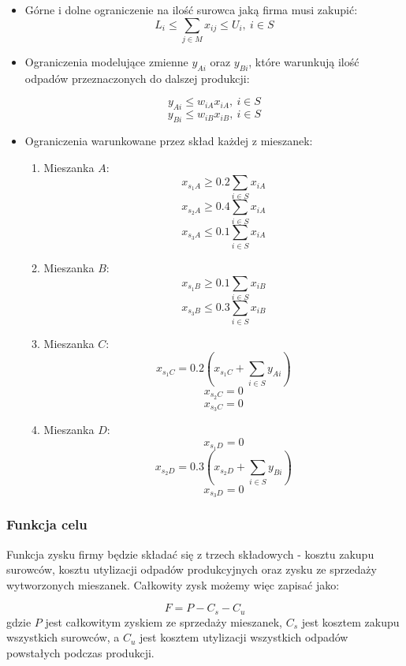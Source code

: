 \documentclass{article}
\begin{document}
        \begin{itemize}
            \item Górne i dolne ograniczenie na ilość surowca jaką firma musi zakupić:
                $$L_i \leq \sum_{j \in M} x_{ij} \leq U_i, \ i \in S$$

            \item Ograniczenia modelujące zmienne $y_{Ai}$ oraz $y_{Bi}$, które warunkują ilość odpadów przeznaczonych do dalszej produkcji:
            
                $$y_{Ai} \leq w_{iA} x_{iA}, \ i \in S$$
                $$y_{Bi} \leq w_{iB} x_{iB}, \ i \in S$$

            \item Ograniczenia warunkowane przez skład każdej z mieszanek:
                \begin{enumerate}
                    \item Mieszanka $A$:
                        $$x_{s_{1}A} \geq 0.2 \sum_{i \in S} x_{iA}$$
                        $$x_{s_{2}A} \geq 0.4 \sum_{i \in S} x_{iA}$$
                        $$x_{s_{3}A} \leq 0.1 \sum_{i \in S} x_{iA}$$
                    \item Mieszanka $B$:
                        $$x_{s_{1}B} \geq 0.1 \sum_{i \in S} x_{iB}$$
                        $$x_{s_{3}B} \leq 0.3 \sum_{i \in S} x_{iB}$$
                    \item Mieszanka $C$:
                        $$x_{s_{1}C} = 0.2 (x_{s_{1}C} + \sum_{i \in S} y_{Ai})$$
                        $$x_{s_{2}C} = 0$$
                        $$x_{s_{3}C} = 0$$
                    \item Mieszanka $D$:
                        $$x_{s_{1}D} = 0$$
                        $$x_{s_{2}D} = 0.3 (x_{s_{2}D} + \sum_{i \in S} y_{Bi})$$
                        $$x_{s_{3}D} = 0$$
                \end{enumerate}
        \end{itemize}

    \subsubsection{Funkcja celu}

        Funkcja zysku firmy będzie składać się z trzech składowych - kosztu zakupu surowców, kosztu utylizacji odpadów produkcyjnych oraz zysku ze 
        sprzedaży wytworzonych mieszanek. Całkowity zysk możemy więc zapisać jako:

        $$F = P - C_s - C_u$$ gdzie $P$ jest całkowitym zyskiem ze sprzedaży mieszanek, $C_s$ jest kosztem zakupu wszystkich surowców, a 
        $C_u$ jest kosztem utylizacji wszystkich odpadów powstałych podczas produkcji.
\end{document}
